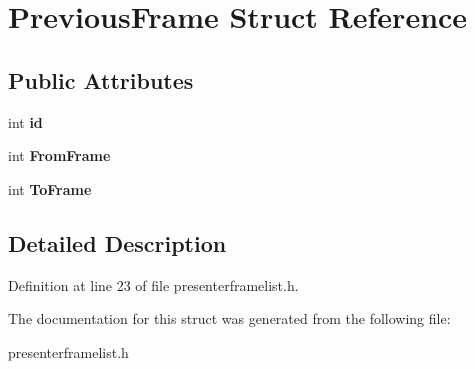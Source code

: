 \hypertarget{struct_previous_frame}{}\section{Previous\+Frame Struct Reference}
\label{struct_previous_frame}
\subsection*{Public Attributes}
\begin{DoxyCompactItemize}
\item 
\mbox{\label{struct_previous_frame_a5a28c233dd3125b595e645898a47a700}} 
int {\bfseries id}
\item 
\mbox{\label{struct_previous_frame_ae0b9923fb29a6f3c510b934b74cb7770}} 
int {\bfseries From\+Frame}
\item 
\mbox{\label{struct_previous_frame_a10b53ca42e0a46671772ca021d05d925}} 
int {\bfseries To\+Frame}
\end{DoxyCompactItemize}


\subsection{Detailed Description}


Definition at line 23 of file presenterframelist.\+h.



The documentation for this struct was generated from the following file\+:\begin{DoxyCompactItemize}
\item 
presenterframelist.\+h\end{DoxyCompactItemize}
